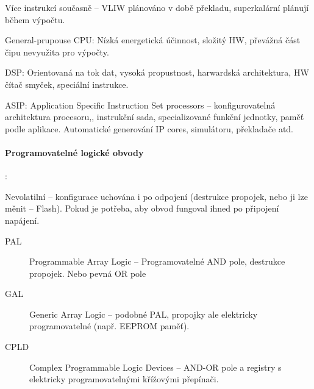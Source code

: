 \documentclass[a4paper, 11pt]{report}
\begin{document}
Více instrukcí současně -- VLIW plánováno v době překladu, superkalární plánují během výpočtu.

General-prupouse CPU: Nízká energetická účinnost, složitý HW, převážná část čipu nevyužita pro výpočty.

DSP: Orientovaná na tok dat, vysoká propustnost, harwardská architektura, HW čítač smyček, speciální instrukce.

ASIP: Application Specific Instruction Set processors -- konfigurovatelná architektura procesoru,, instrukční sada, specializované funkční jednotky, paměť podle aplikace. Automatické generování IP cores, simulátoru, překladače atd.

\paragraph{Programovatelné logické obvody}:

Nevolatilní -- konfigurace uchována i po odpojení (destrukce propojek, nebo ji lze měnit -- Flash). Pokud je potřeba, aby obvod fungoval ihned po připojení napájení.
\begin{description}
	\item[PAL] Programmable Array Logic -- Programovatelné AND pole, destrukce propojek. Nebo pevná OR pole
	\item[GAL] Generic Array Logic -- podobné PAL, propojky ale elektricky programovatelné (např. EEPROM paměť).
	\item[CPLD] Complex Programmable Logic Devices -- AND-OR pole a registry s elektricky programovatelnými křížovými přepínači.
\end{description}
\end{document}
